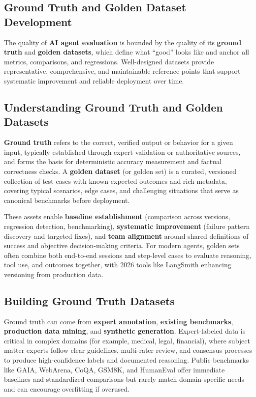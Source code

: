 \begin{TNtwocol}
\section{Ground Truth and Golden Dataset Development}

The quality of \textbf{AI agent evaluation} is bounded by the quality of its \textbf{ground truth} and \textbf{golden datasets}, which define what “good” looks like and anchor all metrics, comparisons, and regressions. Well-designed datasets provide representative, comprehensive, and maintainable reference points that support systematic improvement and reliable deployment over time.

\subsection*{Understanding Ground Truth and Golden Datasets}

\textbf{Ground truth} refers to the correct, verified output or behavior for a given input, typically established through expert validation or authoritative sources, and forms the basis for deterministic accuracy measurement and factual correctness checks. A \textbf{golden dataset} (or golden set) is a curated, versioned collection of test cases with known expected outcomes and rich metadata, covering typical scenarios, edge cases, and challenging situations that serve as canonical benchmarks before deployment.

These assets enable \textbf{baseline establishment} (comparison across versions, regression detection, benchmarking), \textbf{systematic improvement} (failure pattern discovery and targeted fixes), and \textbf{team alignment} around shared definitions of success and objective decision-making criteria. For modern agents, golden sets often combine both end-to-end sessions and step-level cases to evaluate reasoning, tool use, and outcomes together, with 2026 tools like LangSmith enhancing versioning from production data.
​

\subsection*{Building Ground Truth Datasets}

Ground truth can come from \textbf{expert annotation}, \textbf{existing benchmarks}, \textbf{production data mining}, and \textbf{synthetic generation}. Expert-labeled data is critical in complex domains (for example, medical, legal, financial), where subject matter experts follow clear guidelines, multi-rater review, and consensus processes to produce high-confidence labels and documented reasoning. Public benchmarks like GAIA, WebArena, CoQA, GSM8K, and HumanEval offer immediate baselines and standardized comparisons but rarely match domain-specific needs and can encourage overfitting if overused.


\end{TNtwocol}
